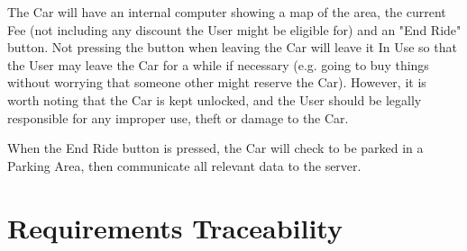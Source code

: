 \documentclass[12pt]{article}
\begin{document}
The Car will have an internal computer showing a map of the area, the current Fee (not including any discount the User might be eligible for) and an "End Ride" button. Not pressing the button when leaving the Car will leave it In Use so that the User may leave the Car for a while if necessary (e.g. going to buy things without worrying that someone other might reserve the Car). However, it is worth noting that the Car is kept unlocked, and the User should be legally responsible for any improper use, theft or damage to the Car.

When the End Ride button is pressed, the Car will check to be parked in a Parking Area, then communicate all relevant data to the server.

\clearpage
\section{Requirements Traceability}
\end{document}
